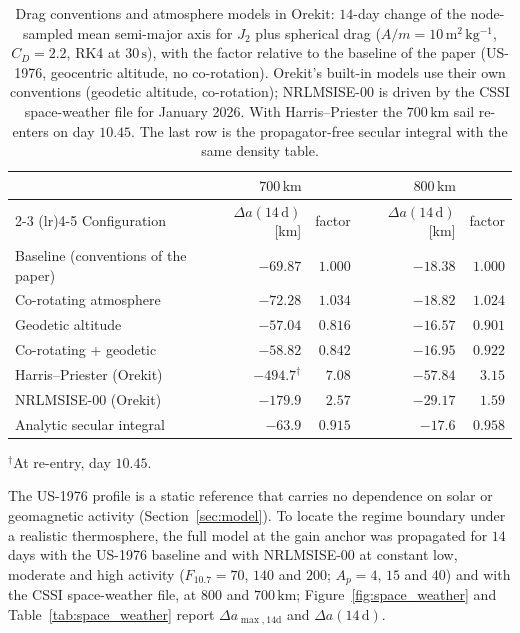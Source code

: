 \begin{table}[htbp]
\centering
\caption{Drag conventions and atmosphere models in Orekit: \(14\)-day change of the node-sampled mean semi-major axis for \(J_2\) plus spherical drag (\(A/m = 10\,\mathrm{m^2\,kg^{-1}}\), \(C_D = 2.2\), RK4 at \(30\,\mathrm{s}\)), with the factor relative to the baseline of the paper (US-1976, geocentric altitude, no co-rotation). Orekit's built-in models use their own conventions (geodetic altitude, co-rotation); NRLMSISE-00 is driven by the CSSI space-weather file for January 2026. With Harris--Priester the \(700\,\mathrm{km}\) sail re-enters on day \(10.45\). The last row is the propagator-free secular integral with the same density table.}
\label{tab:drag_conventions}
\vspace{0.5em}
\footnotesize
\setlength{\tabcolsep}{4pt}
\begin{tabular}{l r r r r}
\toprule
& \multicolumn{2}{c}{\(700\,\mathrm{km}\)} & \multicolumn{2}{c}{\(800\,\mathrm{km}\)} \\
\cmidrule(lr){2-3} \cmidrule(lr){4-5}
Configuration & \(\Delta a(14\,\mathrm{d})\) [km] & factor & \(\Delta a(14\,\mathrm{d})\) [km] & factor \\
\midrule
Baseline (conventions of the paper) & \(-69.87\) & \(1.000\) & \(-18.38\) & \(1.000\) \\
Co-rotating atmosphere & \(-72.28\) & \(1.034\) & \(-18.82\) & \(1.024\) \\
Geodetic altitude & \(-57.04\) & \(0.816\) & \(-16.57\) & \(0.901\) \\
Co-rotating + geodetic & \(-58.82\) & \(0.842\) & \(-16.95\) & \(0.922\) \\
Harris--Priester (Orekit) & \(-494.7^{\dagger}\) & \(7.08\) & \(-57.84\) & \(3.15\) \\
NRLMSISE-00 (Orekit) & \(-179.9\) & \(2.57\) & \(-29.17\) & \(1.59\) \\
Analytic secular integral & \(-63.9\) & \(0.915\) & \(-17.6\) & \(0.958\) \\
\bottomrule
\end{tabular}
\par\vspace{2pt}
{\footnotesize \(^{\dagger}\)At re-entry, day \(10.45\).}
\end{table}

\vspace{5pt}
\par\noindent The US-1976 profile is a static reference that carries no dependence on solar or geomagnetic activity (Section~\ref{sec:model}). To locate the regime boundary under a realistic thermosphere, the full model at the gain anchor was propagated for \(14\) days with the US-1976 baseline and with NRLMSISE-00 at constant low, moderate and high activity (\(F_{10.7} = 70\), \(140\) and \(200\); \(A_p = 4\), \(15\) and \(40\)) and with the CSSI space-weather file, at \(800\) and \(700\,\mathrm{km}\); Figure~\ref{fig:space_weather} and Table~\ref{tab:space_weather} report \(\Delta a_{\max,14\mathrm{d}}\) and \(\Delta a(14\,\mathrm{d})\).

